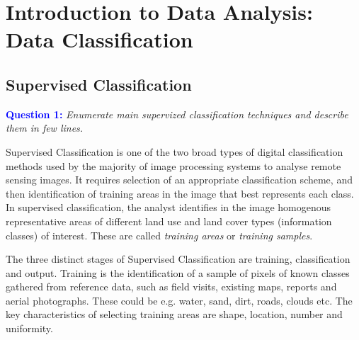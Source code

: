 \section{Introduction to Data Analysis: Data Classification}
\label{sec:data_analysis}

\subsection{Supervised Classification}
\textcolor{blue}{\textbf{Question 1:}}
\textit{Enumerate main supervized classiﬁcation techniques and describe them in few lines.}

Supervised Classification is one of the two broad types of digital classification methods used by the majority of image processing systems to analyse remote sensing images. It requires selection of an appropriate classification scheme, and then identification of training areas in the image that best represents each class. In supervised classification, the analyst identifies in the image homogenous representative areas of different land use and land cover types (information classes) of interest. These are called \textit{training areas} or \textit{training samples}. 

The three distinct stages of Supervised Classification are training, classification and output. Training is the identification of a sample of pixels of known classes gathered from reference data, such as field visits, existing maps, reports and aerial photographs. These could be e.g. water, sand, dirt, roads, clouds etc. The key characteristics of selecting training areas are shape, location, number and uniformity.

\cite{garg_remote_2024}


